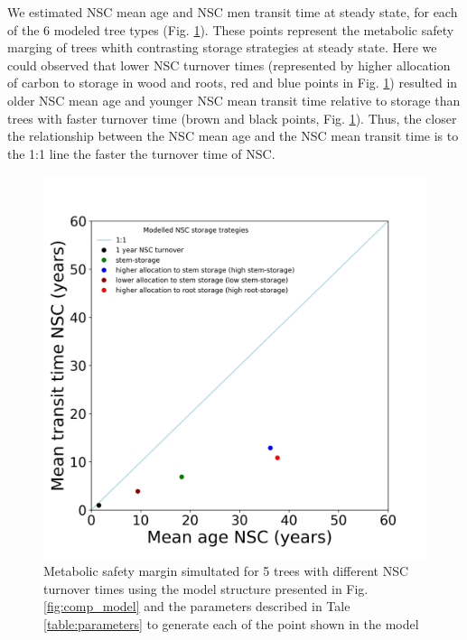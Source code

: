 \documentclass{article}
\begin{document}
We estimated NSC mean age and NSC men transit time at steady state, for each of the 6 modeled tree types (Fig. \ref{fig:msm_steady}).
These points represent the metabolic safety marging of trees whith contrasting storage strategies at steady state.  
Here we could observed that lower NSC turnover times (represented by higher allocation of carbon to storage in wood and roots, red and blue points in Fig. \ref{fig:msm_steady}) resulted in older NSC mean age and younger NSC mean transit time relative to storage than trees with faster turnover time (brown and black points, Fig. \ref{fig:msm_steady}). 
Thus, the closer the relationship between the NSC mean age and the NSC mean transit time is to the 1:1 line the faster the turnover time of NSC. 


 \begin{figure}[h] %
   \centering
   \includegraphics[width=5in]{metabolic_safety_steady_state.png} 
   \caption{Metabolic safety margin simultated for 5 trees with different NSC turnover times using the model structure presented in Fig. \ref{fig:comp_model} and the parameters described in Tale \ref{table:parameters} to generate each of the point shown in the model}
   \label{fig:msm_steady}
\end{figure}
\end{document}
